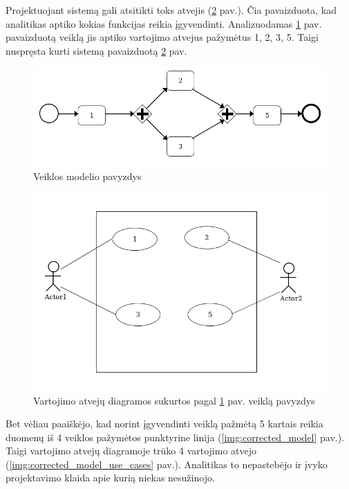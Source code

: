 \documentclass{VUMIFInfBakalaurinis}
\begin{document}
Projektuojant sistemą gali atsitikti toks atvejis (\ref{img:bad_model_use_cases} pav.). Čia pavaizduota, kad analitikas aptiko kokias funkcijas reikia įgyvendinti. Analizuodamas \ref{img:bad_model} pav. pavaizduotą veiklą jis aptiko vartojimo atvejus pažymėtus 1, 2, 3, 5. Taigi nuspręsta kurti sistemą pavaizduotą  \ref{img:bad_model_use_cases} pav.

\begin{figure}[H]
	\centering
	\includegraphics[width=\textwidth]{img/bad_modeling/bad_model}
	\caption{Veiklos modelio pavyzdys}
	\label{img:bad_model}
\end{figure}
\begin{figure}[H]
	\centering
	\includegraphics[width=15cm]{img/bad_modeling/bad_model_use_cases}
	\caption{Vartojimo atvejų diagramos sukurtos pagal \ref{img:bad_model} pav. veiklą pavyzdys}
	\label{img:bad_model_use_cases}
\end{figure}

Bet vėliau paaiškėjo, kad norint įgyvendinti veiklą pažmėtą 5 kartais reikia duomenų iš 4 veiklos pažymėtos punktyrine linija (\ref{img:corrected_model} pav.). Taigi vartojimo atvejų diagramoje trūko 4 vartojimo atvejo (\ref{img:corrected_model_use_cases} pav.). Analitikas to nepastebėjo ir įvyko projektavimo klaida apie kurią niekas nesužinojo.
\end{document}

